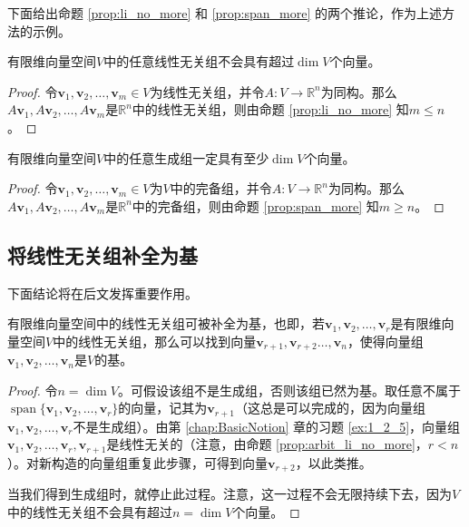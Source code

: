 下面给出命题 \ref{prop:li_no_more} 和 \ref{prop:span_more} 的两个推论，作为上述方法的示例。
\begin{proposition}\label{prop:arbit_li_no_more}
  有限维向量空间$V$中的任意线性无关组不会具有超过$\dim V$个向量。
\end{proposition}
\begin{proof}
  令$\mathbf{v}_1,\mathbf{v}_2,\ldots,\mathbf{v}_m\in V$为线性无关组，并令$A:V\to \mathbb{R}^n$为同构。那么$A\mathbf{v}_{1},A\mathbf{v}_{2},\ldots,A\mathbf{v}_{m}$是$\mathbb{R}^n$中的线性无关组，则由命题 \ref{prop:li_no_more} 知$m\le n$。
\end{proof}
\begin{proposition}\label{prop:arbit_span_more}
  有限维向量空间$V$中的任意生成组一定具有至少$\dim V$个向量。
\end{proposition}
\begin{proof}
  令$\mathbf{v}_1,\mathbf{v}_2,\ldots,\mathbf{v}_m\in V$为$V$中的完备组，并令$A:V\to \mathbb{R}^n$为同构。那么$A\mathbf{v}_{1},A\mathbf{v}_{2},\ldots,A\mathbf{v}_{m}$是$\mathbb{R}^n$中的完备组，则由命题 \ref{prop:span_more} 知$m\ge n$。
\end{proof}

\subsection{将线性无关组补全为基}

下面结论将在后文发挥重要作用。

\begin{proposition}[补全为基]\label{prop:completion}
  有限维向量空间中的线性无关组可被补全为基，也即，若$\mathbf{v}_1,\mathbf{v}_2,\ldots,\mathbf{v}_r$是有限维向量空间$V$中的线性无关组，那么可以找到向量$\mathbf{v}_{r+1},\mathbf{v}_{r+2}\ldots,\mathbf{v}_{n}$，使得向量组$\mathbf{v}_1,\mathbf{v}_2,\ldots,\mathbf{v}_n$是$V$的基。
\end{proposition}

\begin{proof}
  令$n=\dim V$。可假设该组不是生成组，否则该组已然为基。取任意不属于$\operatorname{span}\{\mathbf{v}_{1},\mathbf{v}_{2},\ldots,\mathbf{v}_{r}\}$的向量，记其为$\mathbf{v}_{r+1}$（这总是可以完成的，因为向量组$\mathbf{v}_1,\mathbf{v}_2,\ldots,\mathbf{v}_r$不是生成组）。由第 \ref{chap:BasicNotion} 章的习题 \ref{ex:1_2_5}，向量组$\mathbf{v}_1,\mathbf{v}_2,\ldots,\mathbf{v}_r,\mathbf{v}_{r+1}$是线性无关的（注意，由命题 \ref{prop:arbit_li_no_more}，$r<n$）。对新构造的向量组重复此步骤，可得到向量$\mathbf{v}_{r+2}$，以此类推。

  当我们得到生成组时，就停止此过程。注意，这一过程不会无限持续下去，因为$V$中的线性无关组不会具有超过$n=\dim V$个向量。
\end{proof}

